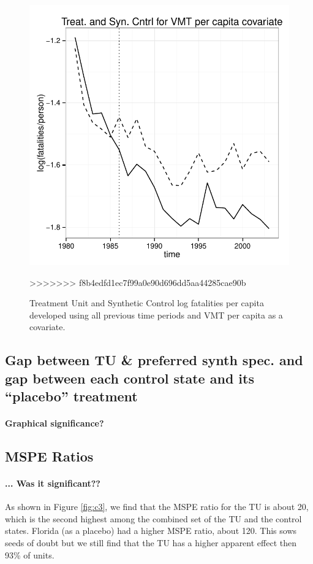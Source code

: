 \documentclass[letterpaper, 12pt]{article}
\begin{document}
\begin{figure}[htbp]
\begin{center}
\includegraphics{img-split-vmt.pdf}
\caption{Treatment Unit and Synthetic Control log fatalities per capita developed using all previous time periods and VMT per capita as a covariate.}
\label{fig:c16}
\end{center}
>>>>>>> f8b4edfd1ec7f99a0e90d696dd5aa44285cae90b
\end{figure}


\subsection{Gap between TU \& preferred synth spec. and gap between each control state and its ``placebo'' treatment}

\paragraph{Graphical significance?}


\subsection{MSPE Ratios}

\paragraph{... Was it significant??}  As shown in Figure \ref{fig:c3}, we find that the MSPE ratio for the TU is about 20, which is the second highest among the combined set of the TU and the control states.  Florida (as a placebo) had a higher MSPE ratio, about 120.  This sows seeds of doubt but we still find that the TU has a higher apparent effect then 93\% of units.  
\end{document}
